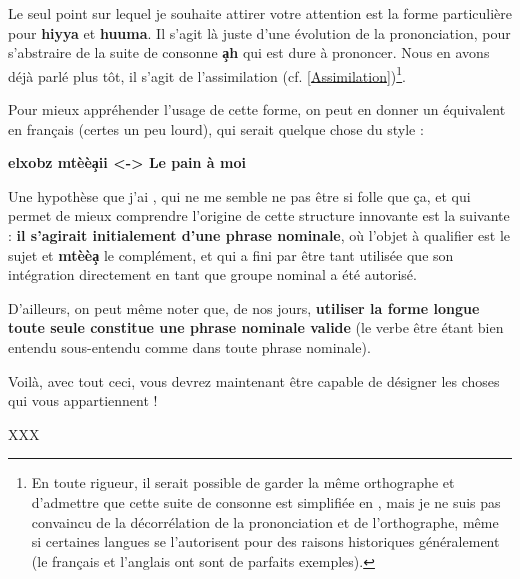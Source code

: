Le seul point sur lequel je souhaite attirer votre attention est la forme particulière pour \textbf{hiyya} et \textbf{huuma}. Il s'agit là juste d'une évolution de la prononciation, pour s'abstraire de la suite de consonne \textbf{\c{a}h} qui est dure à prononcer. Nous en avons déjà parlé plus tôt, il s'agit de l'assimilation (cf. \ref{Assimilation})\footnote{En toute rigueur, il serait possible de garder la même orthographe et d'admettre que cette suite de consonne est simplifiée en \textcrh\textcrh, mais je ne suis pas convaincu de la décorrélation de la prononciation et de l'orthographe, même si certaines langues se l'autorisent pour des raisons historiques généralement (le français et l'anglais ont sont de parfaits exemples).}.

Pour mieux appréhender l'usage de cette forme, on peut en donner un équivalent en français (certes un peu lourd), qui serait quelque chose du style : 

\begin{center}
    \textbf{elxobz mtèè\c{a}ii <-> Le pain à moi}
\end{center}

Une hypothèse que j'ai , qui ne me semble ne pas être si folle que ça, et qui permet de mieux comprendre l'origine de cette structure innovante est la suivante : \textbf{il s'agirait initialement d'une phrase nominale}, où l'objet à qualifier est le sujet et \textbf{mtèè\c{a}} le complément, et qui a fini par être tant utilisée que son intégration directement en tant que groupe nominal a été autorisé.

D'ailleurs, on peut même noter que, de nos jours, \textbf{utiliser la forme longue toute seule constitue une phrase nominale valide} (le verbe être étant bien entendu sous-entendu comme dans toute phrase nominale).

Voilà, avec tout ceci, vous devrez maintenant être capable de désigner les choses qui vous appartiennent !  

XXX